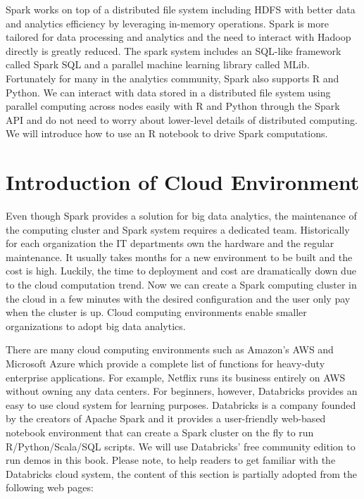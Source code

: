\documentclass[12pt,]{krantz}
\begin{document}
Spark works on top of a distributed file system including HDFS with better data and analytics efficiency by leveraging in-memory operations. Spark is more tailored for data processing and analytics and the need to interact with Hadoop directly is greatly reduced. The spark system includes an SQL-like framework called Spark SQL and a parallel machine learning library called MLib. Fortunately for many in the analytics community, Spark also supports R and Python. We can interact with data stored in a distributed file system using parallel computing across nodes easily with R and Python through the Spark API and do not need to worry about lower-level details of distributed computing. We will introduce how to use an R notebook to drive Spark computations.

\hypertarget{CloudEnvironment}{%
\section{Introduction of Cloud Environment}\label{CloudEnvironment}}

Even though Spark provides a solution for big data analytics, the maintenance of the computing cluster and Spark system requires a dedicated team. Historically for each organization the IT departments own the hardware and the regular maintenance. It usually takes months for a new environment to be built and the cost is high. Luckily, the time to deployment and cost are dramatically down due to the cloud computation trend. Now we can create a Spark computing cluster in the cloud in a few minutes with the desired configuration and the user only pay when the cluster is up. Cloud computing environments enable smaller organizations to adopt big data analytics.

There are many cloud computing environments such as Amazon's AWS and Microsoft Azure which provide a complete list of functions for heavy-duty enterprise applications. For example, Netflix runs its business entirely on AWS without owning any data centers. For beginners, however, Databricks provides an easy to use cloud system for learning purposes. Databricks is a company founded by the creators of Apache Spark and it provides a user-friendly web-based notebook environment that can create a Spark cluster on the fly to run R/Python/Scala/SQL scripts. We will use Databricks' free community edition to run demos in this book. Please note, to help readers to get familiar with the Databricks cloud system, the content of this section is partially adopted from the following web pages:
\end{document}
